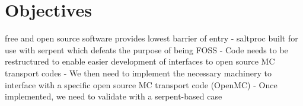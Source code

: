 \section{Objectives}%
\label{sec:objectives}

 free and open source software provides lowest barrier of entry
 - saltproc built for use with serpent which defeats the purpose of being
    FOSS
 - Code needs to be restructured to enable easier development of interfaces to 
 open source MC transport codes
 - We then need to implement the necessary machinery to interface with a specific
    open source MC transport code (OpenMC)
 - Once implemented, we need to validate with a serpent-based case
